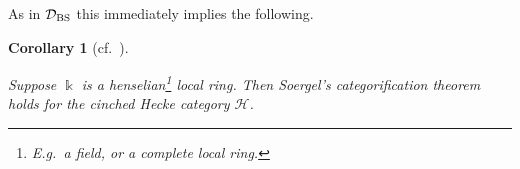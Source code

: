 \documentclass{amsart}
\theoremstyle{plain}
\newtheorem{lem}[thm]{Lemma}
\newtheorem{cor}[thm]{Corollary}
\theoremstyle{definition}
\theoremstyle{remark}
\numberwithin{equation}{section}
\DeclareMathOperator{\Hom}{Hom}
\begin{document}
As in $\mathcal{D}_{\rm BS}$ this immediately implies the following.

\begin{cor}[{cf.~\cite[Theorem 11.1, Assumption 11.25]{emtw}}] \label{cor:cinchedSoergelcatthm} \hfill

Suppose $\Bbbk$ is a henselian\footnote{E.g.~a field, or a complete local ring.} local ring. 
Then Soergel's categorification theorem holds for the cinched Hecke category $\mathcal{H}$.
\end{cor}



%
%
\end{document}

